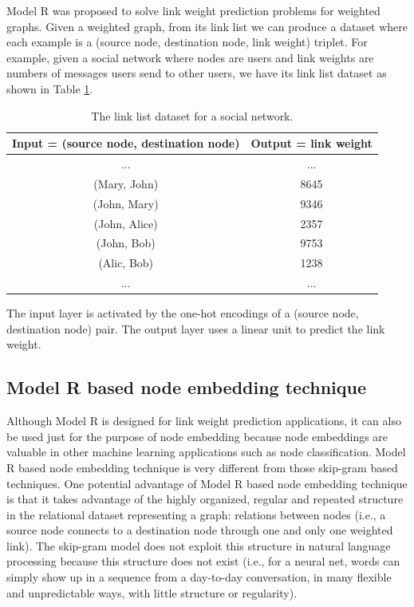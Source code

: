 \documentclass[conference]{IEEEtran}
\begin{document}
Model R was proposed to solve link weight prediction problems for weighted graphs.
Given a weighted graph, from its link list we can produce a dataset where each example is a (source node, destination node, link weight) triplet.
For example, given a social network where nodes are users and link weights are numbers of messages users send to other users, we have its link list dataset as shown in Table \ref{tab:link-list-dataset}.
\begin{table}[!ht]
	\centering
	\caption{The link list dataset for a social network.}
	\begin{tabular}{cc}  \hline \rowcolor{blue!30}
		Input = (source node, destination node) & Output = link weight \\ \hline
		...                        & ... \\ \hline
		(Mary, John) & 8645 \\ \hline
		(John, Mary) & 9346 \\ \hline
		(John, Alice) & 2357 \\ \hline
		(John, Bob) & 9753 \\ \hline
		(Alic, Bob) & 1238 \\ \hline
		...                        & ... \\ \hline
	\end{tabular}
	\label{tab:link-list-dataset}
\end{table}
The input layer is activated by the one-hot encodings of a (source node, destination node) pair. The output layer uses a linear unit to predict the link weight.

\subsection{Model R based node embedding technique}
Although Model R is designed for link weight prediction applications,
it can also be used just for the purpose of node embedding because node embeddings are valuable in other machine learning applications such as node classification.
Model R based node embedding technique is very different from those skip-gram based techniques.
One potential advantage of Model R based node embedding technique is that it takes advantage of the highly organized, regular and repeated structure in the relational dataset representing a graph: 
relations between nodes (i.e., a source node connects to a destination node through one and only one weighted link).
The skip-gram model does not exploit this structure in natural language processing because this structure does not exist (i.e., for a neural net, words can simply show up in a sequence from a day-to-day conversation, in many flexible and unpredictable ways, with little structure or regularity).
\end{document}
